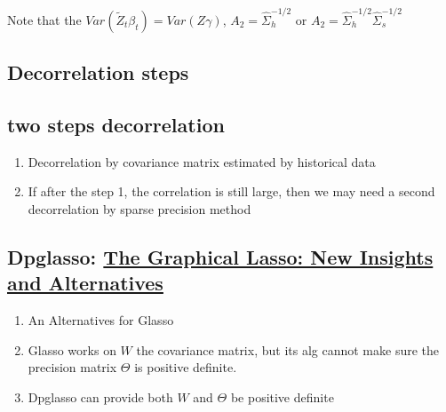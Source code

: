 \documentclass[]{article}
\providecommand{\tightlist}{%
  \setlength{\itemsep}{0pt}\setlength{\parskip}{0pt}}
\begin{document}
Note that the \(Var(\tilde{Z}_t \beta_t) = Var(Z\gamma)\),
\(A_2 = \hat{\Sigma}^{-1/2}_h\) or
\(A_2 = \hat{\Sigma}^{-1/2}_h \hat{\Sigma}^{-1/2}_s\)

\subsection{Decorrelation steps}\label{decorrelation-steps}

\subsection{two steps decorrelation}\label{two-steps-decorrelation}

\begin{enumerate}
\def\labelenumi{\arabic{enumi}.}
\tightlist
\item
  Decorrelation by covariance matrix estimated by historical data
\item
  If after the step 1, the correlation is still large, then we may need
  a second decorrelation by sparse precision method
\end{enumerate}

\subsection{\texorpdfstring{Dpglasso:
\href{https://arxiv.org/pdf/1111.5479.pdf}{The Graphical Lasso: New
Insights and
Alternatives}}{Dpglasso: The Graphical Lasso: New Insights and Alternatives}}\label{dpglasso-the-graphical-lasso-new-insights-and-alternatives}

\begin{enumerate}
\def\labelenumi{\arabic{enumi}.}
\tightlist
\item
  An Alternatives for Glasso
\item
  Glasso works on \(W\) the covariance matrix, but its alg cannot make
  sure the precision matrix \(\Theta\) is positive definite.
\item
  Dpglasso can provide both \(W\) and \(\Theta\) be positive definite
\end{enumerate}
\end{document}
